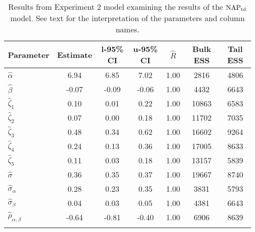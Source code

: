 \begin{table}

\caption{Results from Experiment 2 model examining the results of the $\operatorname{NAP}_{\text{td}}$ model. \label{tab:Experiment 2-NAPtd}See text for the interpretation of the parameters and column names.}

\begin{tabular}{l *3{S[table-format=-1.2]} S[table-format=1.2] *2{S[table-format=5.0]}}
\lsptoprule
Parameter & {Estimate} & {l-95\% CI} & {u-95\% CI} & {$\hat{R}$} & {Bulk ESS} & {Tail ESS}\\
\midrule
$\hat\alpha$ & 6.94 & 6.85 & 7.02 & 1.00 & 2816 & 4806\\
$\hat\beta$ & -0.07 & -0.09 & -0.06 & 1.00 & 4432 & 6643\\
$\hat\zeta_{1}$ & 0.10 & 0.01 & 0.22 & 1.00 & 10863 & 6583\\
$\hat\zeta_{2}$ & 0.07 & 0.00 & 0.18 & 1.00 & 11702 & 7035\\
$\hat\zeta_{3}$ & 0.48 & 0.34 & 0.62 & 1.00 & 16602 & 9264\\
$\hat\zeta_{4}$ & 0.24 & 0.13 & 0.36 & 1.00 & 17005 & 8633\\
$\hat\zeta_{5}$ & 0.11 & 0.03 & 0.18 & 1.00 & 13157 & 5839\\
$\hat\sigma$ & 0.36 & 0.35 & 0.37 & 1.00 & 19667 & 8740\\
$\hat\sigma_{\alpha}$ & 0.28 & 0.23 & 0.35 & 1.00 & 3831 & 5793\\
$\hat\sigma_{\beta}$ & 0.04 & 0.03 & 0.05 & 1.00 & 4381 & 6643\\
$\hat\rho_{\alpha,\beta}$ & -0.64 & -0.81 & -0.40 & 1.00 & 6906 & 8639\\
\lspbottomrule
\end{tabular}

\end{table}




